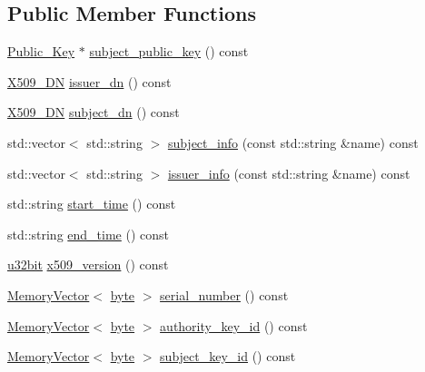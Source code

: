 \subsection*{Public Member Functions}
\begin{DoxyCompactItemize}
\item 
\hyperlink{classBotan_1_1Public__Key}{Public\-\_\-\-Key} $\ast$ \hyperlink{classBotan_1_1X509__Certificate_a7f67b730233031244af0217423ee1a88}{subject\-\_\-public\-\_\-key} () const 
\item 
\hyperlink{classBotan_1_1X509__DN}{X509\-\_\-\-D\-N} \hyperlink{classBotan_1_1X509__Certificate_a9e94f58cb97604f498b3fb053af464ca}{issuer\-\_\-dn} () const 
\item 
\hyperlink{classBotan_1_1X509__DN}{X509\-\_\-\-D\-N} \hyperlink{classBotan_1_1X509__Certificate_a34be053f97aaae4c1d4f0818421d8504}{subject\-\_\-dn} () const 
\item 
std\-::vector$<$ std\-::string $>$ \hyperlink{classBotan_1_1X509__Certificate_a2f3cb78942270c70efe41bc250bfb0ec}{subject\-\_\-info} (const std\-::string \&name) const 
\item 
std\-::vector$<$ std\-::string $>$ \hyperlink{classBotan_1_1X509__Certificate_ab8551d92c75333bd670b8908298ee3d0}{issuer\-\_\-info} (const std\-::string \&name) const 
\item 
std\-::string \hyperlink{classBotan_1_1X509__Certificate_a8f76631ff8c041d3100cd6dee78f0a61}{start\-\_\-time} () const 
\item 
std\-::string \hyperlink{classBotan_1_1X509__Certificate_aabe224d01b9c01b442a809e408b1be34}{end\-\_\-time} () const 
\item 
\hyperlink{namespaceBotan_aacc7d03c95e97e76168fc1c819031830}{u32bit} \hyperlink{classBotan_1_1X509__Certificate_a6fd89fb5d01d8915db58754cb2c2ab58}{x509\-\_\-version} () const 
\item 
\hyperlink{classBotan_1_1MemoryVector}{Memory\-Vector}$<$ \hyperlink{namespaceBotan_a7d793989d801281df48c6b19616b8b84}{byte} $>$ \hyperlink{classBotan_1_1X509__Certificate_afb90543f87b2b102d88f1c2e5977e2f7}{serial\-\_\-number} () const 
\item 
\hyperlink{classBotan_1_1MemoryVector}{Memory\-Vector}$<$ \hyperlink{namespaceBotan_a7d793989d801281df48c6b19616b8b84}{byte} $>$ \hyperlink{classBotan_1_1X509__Certificate_aed3896519a62410ef91ff283e17fb952}{authority\-\_\-key\-\_\-id} () const 
\item 
\hyperlink{classBotan_1_1MemoryVector}{Memory\-Vector}$<$ \hyperlink{namespaceBotan_a7d793989d801281df48c6b19616b8b84}{byte} $>$ \hyperlink{classBotan_1_1X509__Certificate_adaa45702bf68b58bc071477bd31968f1}{subject\-\_\-key\-\_\-id} () const 

\end{DoxyCompactItemize}
